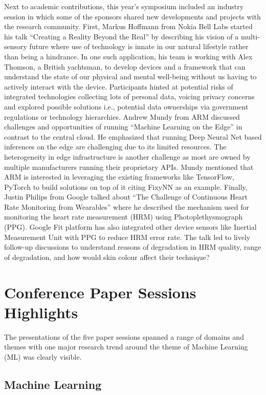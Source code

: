 \documentclass[conference]{IEEEtran}
\begin{document}
Next to academic contributions, this year’s symposium included an industry session in which some of the sponsors shared new developments and projects with the research community. First, Markus Hoffmann from Nokia Bell Labs started his talk “Creating a Reality Beyond the Real” by describing his vision of a multi-sensory future where use of technology is innate in our natural lifestyle rather than being a hindrance. In one such application, his team is working with Alex Thomson, a British yachtsman, to develop devices and a framework that can understand the state of our physical and mental well-being without us having to actively interact with the device. Participants hinted at potential risks of integrated technologies collecting lots of personal data, voicing privacy concerns and explored possible solutions i.e., potential data ownerships via government regulations or technology hierarchies.
Andrew Mundy from ARM discussed challenges and opportunities of running “Machine Learning on the Edge” in contrast to the central cloud. He emphasized that running Deep Neural Net based inferences on the edge are challenging due to its limited resources. The heterogeneity in edge infrastructure is another challenge as most are owned by multiple manufacturers running their proprietary APIs. Mundy mentioned that ARM is interested in leveraging the existing frameworks like TensorFlow, PyTorch to build solutions on top of it citing FixyNN as an example.
Finally, Justin Philips from Google talked about “The Challenge of Continuous Heart Rate Monitoring from Wearables” where he described the mechanism used for monitoring the heart rate measurement (HRM) using Photoplethysmograph (PPG). Google Fit platform has also integrated other device sensors like Inertial Measurement Unit with PPG to reduce HRM error rate. The talk led to lively follow-up discussions to understand reasons of degradation in HRM quality, range of degradation, and how would skin colour affect their technique? 



\section{Conference Paper Sessions Highlights}

The presentations of the five paper sessions spanned a range of domains and themes with one major research trend around the theme of Machine Learning (ML) was clearly visible.  

\subsection{Machine Learning}
\end{document}
